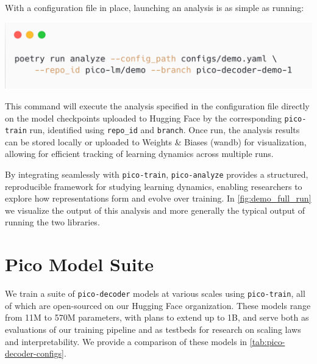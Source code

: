 {With a configuration file in place, launching an analysis is as simple as running:

\begin{center}
    \includegraphics[width=0.7\columnwidth]{chapters/pico/figures/demo/demo_run_analyze.png}
\end{center}

This command will execute the analysis specified in the configuration file directly on the model checkpoints uploaded to Hugging Face by the corresponding \texttt{pico-train} run, identified using \verb|repo_id| and \verb|branch|. Once run, the analysis results can be stored locally or uploaded to Weights \& Biases (wandb) \citep{wandb} for visualization, allowing for efficient tracking of learning dynamics across multiple runs.  

By integrating seamlessly with \texttt{pico-train}, \texttt{pico-analyze} provides a structured, reproducible framework for studying learning dynamics, enabling researchers to explore how representations form and evolve over training. In \cref{fig:demo_full_run} we visualize the output of this analysis and more generally the typical output of running the two libraries. 


\section{Pico Model Suite}

We train a suite of \texttt{pico-decoder} models at various scales using \texttt{pico-train}, all of which are open-sourced on our Hugging Face organization. These models range from 11M to 570M parameters, with plans to extend up to 1B, and serve both as evaluations of our training pipeline and as testbeds for research on scaling laws and interpretability. We provide a comparison of these models in \cref{tab:pico-decoder-configs}.

}

